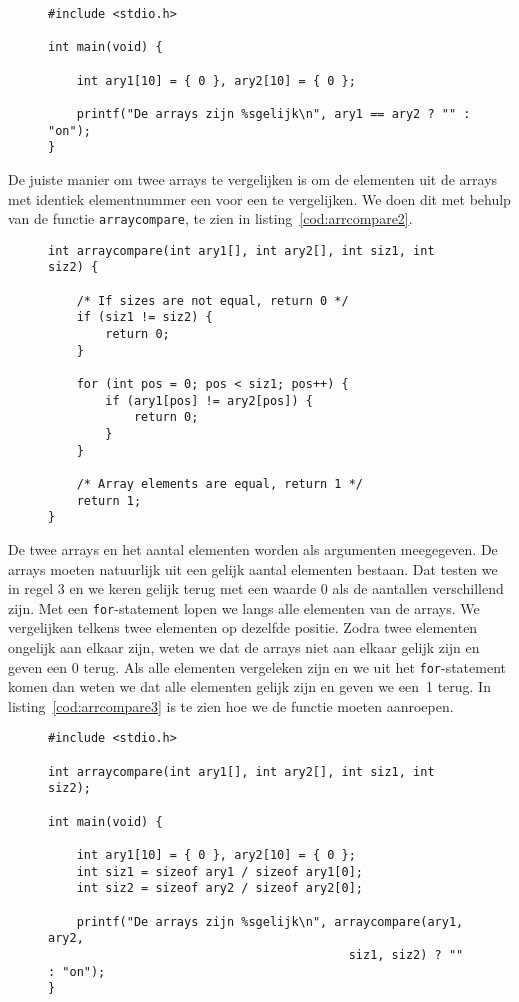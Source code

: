 \begin{figure}[!ht]
\begin{lstlisting}[caption=Vergelijken van twee arrays (foutief).,label=cod:arrcompare]
#include <stdio.h>

int main(void) {

	int ary1[10] = { 0 }, ary2[10] = { 0 };

	printf("De arrays zijn %sgelijk\n", ary1 == ary2 ? "" : "on");
}
\end{lstlisting}
\end{figure}

De juiste manier om twee arrays te vergelijken is om de elementen uit de arrays met identiek elementnummer een voor een te vergelijken. We doen dit met behulp van de functie \texttt{arraycompare}, te zien in listing~\ref{cod:arrcompare2}.

\begin{figure}[H]
\begin{lstlisting}[caption=Vergelijken van twee arrays.,label=cod:arrcompare2]
int arraycompare(int ary1[], int ary2[], int siz1, int siz2) {

    /* If sizes are not equal, return 0 */
    if (siz1 != siz2) {
        return 0;
    }

	for (int pos = 0; pos < siz1; pos++) {
		if (ary1[pos] != ary2[pos]) {
			return 0;
		}
	}
    
    /* Array elements are equal, return 1 */
	return 1;
}
\end{lstlisting}
\end{figure}

De twee arrays en het aantal elementen worden als argumenten meegegeven. De arrays moeten natuurlijk uit een gelijk aantal elementen bestaan. Dat testen we in regel 3 en we keren gelijk terug met een waarde 0 als de aantallen verschillend zijn. Met een \texttt{for}-statement lopen we langs alle elementen van de arrays. We vergelijken telkens twee elementen op dezelfde positie. Zodra twee elementen ongelijk aan elkaar zijn, weten we dat de arrays niet aan elkaar gelijk zijn en geven een 0 terug. Als alle elementen vergeleken zijn en we uit het \texttt{for}-statement komen dan weten we dat alle elementen gelijk zijn en geven we een~1 terug. In listing~\ref{cod:arrcompare3} is te zien hoe we de functie moeten aanroepen.

\begin{figure}[!ht]
\begin{lstlisting}[caption=Vergelijken van twee arrays.,label=cod:arrcompare3]
#include <stdio.h>

int arraycompare(int ary1[], int ary2[], int siz1, int siz2);
	
int main(void) {

	int ary1[10] = { 0 }, ary2[10] = { 0 };
    int siz1 = sizeof ary1 / sizeof ary1[0];
    int siz2 = sizeof ary2 / sizeof ary2[0];
    
	printf("De arrays zijn %sgelijk\n", arraycompare(ary1, ary2,
                                          siz1, siz2) ? "" : "on");
}
\end{lstlisting}
\end{figure}

